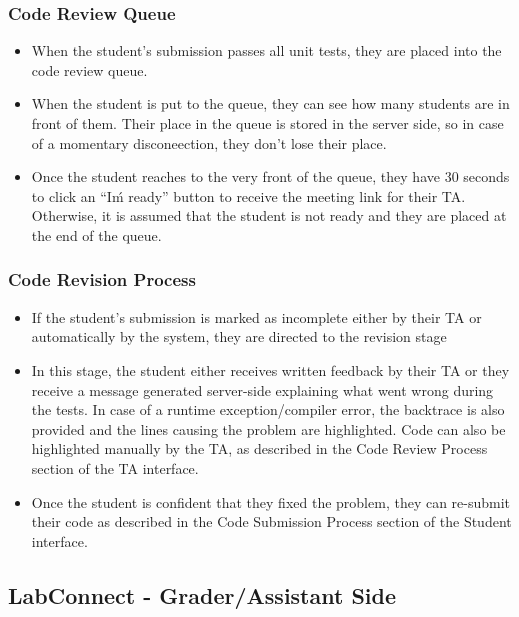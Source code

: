 \documentclass[a4paper, 12pt]{article}
\begin{document}
    \subsubsection{Code Review Queue}

    \begin{itemize}

      \item When the student's submission passes all unit tests, they are placed into the code review queue.
      \item When the student is put to the queue, they can see how many students are in front of them. Their place in the queue is
      stored in the server side, so in case of a momentary disconeection, they don't lose their place.
      \item Once the student reaches to the very front of the queue, they have 30 seconds to click an ``I\'m ready''
      button to receive the meeting link for their TA. Otherwise, it is assumed that the student is not ready and they
      are placed at the end of the queue.
    \end{itemize}

    \subsubsection{Code Revision Process}


    \begin{itemize}
      \item If the student's submission is marked as incomplete either by their TA or automatically by the system, they are directed
      to the revision stage
      \item In this stage, the student either receives written feedback by their TA or they receive a message generated server-side explaining
      what went wrong during the tests. In case of a runtime exception/compiler error, the backtrace is also provided and the lines causing the
      problem are highlighted. Code can also be highlighted manually by the TA, as described in the Code Review Process section of the TA interface.
      \item Once the student is confident that they fixed the problem, they can re-submit their code as described in the Code Submission Process
      section of the Student interface.
    \end{itemize}

    \subsection{LabConnect - Grader/Assistant Side}
\end{document}
